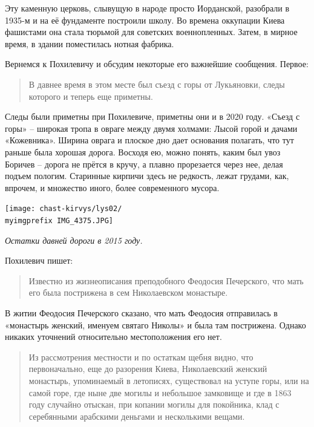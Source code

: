 Эту каменную церковь, слывущую в народе просто Иорданской, разобрали в 1935-м и на её фундаменте построили школу. Во времена оккупации Киева фашистами она стала тюрьмой для советских военнопленных. Затем, в мирное время, в здании поместилась нотная фабрика.

Вернемся к Похилевичу и обсудим некоторые его важнейшие сообщения. Первое:

\begin{quotation}
В давнее время в этом месте был съезд с горы от Лукьяновки, следы которого и теперь еще приметны.
\end{quotation}

Следы были приметны при Похилевиче, приметны они и в 2020 году. «Съезд с горы» – широкая тропа в овраге между двумя холмами: Лысой горой и дачами «Кожевника». Ширина оврага и плоское дно дает основания полагать, что тут раньше была хорошая дорога. Восходя ею, можно понять, каким был увоз Боричев – дорога не прётся в кручу, а плавно прорезается через нее, делая подъем пологим. Старинные кирпичи здесь не редкость, лежат грудами, как, впрочем, и множество иного, более современного мусора.

\begin{center}
\texttt{[image: chast-kirvys/lys02/\\myimgprefix IMG\_4375.JPG]}

\textit{Остатки давней дороги в 2015 году.}
\end{center}

Похилевич пишет:

\begin{quotation}
Известно из жизнеописания преподобного Феодосия Печерского, что мать его была пострижена в сем Николаевском монастыре. 
\end{quotation}

В житии Феодосия Печерского сказано, что мать Феодосия отправилась в «монастырь женский, именуем святаго Николы» и была там пострижена. Однако никаких уточнений относительно местоположения его нет.

\begin{quotation}
Из рассмотрения местности и по остаткам щебня видно, что первоначально, еще до разорения Киева, Николаевский женский монастырь, упоминаемый в летописях, существовал на уступе горы, или на самой горе, где ныне две могилы и небольшое замковище и где в 1863 году случайно отыскан, при копании могилы для покойника, клад с серебянными арабскими деньгами и несколькими вещами.
\end{quotation}

